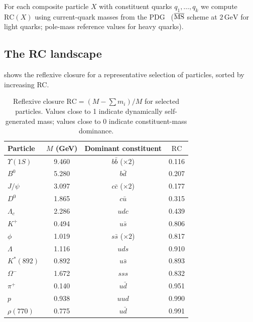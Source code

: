 \documentclass[12pt,a4paper]{article}
\newcommand{\RC}{\ensuremath{\mathrm{RC}}}
\begin{document}
For each composite particle $X$ with constituent quarks $q_1, \ldots, q_k$
we compute $\RC(X)$ using current-quark masses from the
PDG~\cite{ParticleDataGroup2024} ($\overline{\rm MS}$ scheme at $2\,\mathrm{GeV}$
for light quarks; pole-mass reference values for heavy quarks).

\subsection{The RC landscape}

 shows the reflexive closure for a representative
selection of particles, sorted by increasing RC.

\begin{table}[h]
\centering
\caption{Reflexive closure $\RC = (M - \sum m_i)/M$ for selected particles.
  Values close to 1 indicate dynamically self-generated mass;
  values close to 0 indicate constituent-mass dominance.}
\label{tab:rc_sample}
\small
\begin{tabular}{lccc}
\toprule
Particle & $M$ (GeV) & Dominant constituent & $\RC$ \\
\midrule
$\Upsilon(1S)$  & 9.460 & $b\bar b$ ($\times 2$) & 0.116 \\
$B^0$           & 5.280 & $b\bar d$              & 0.207 \\
$J/\psi$        & 3.097 & $c\bar c$ ($\times 2$) & 0.177 \\
$D^0$           & 1.865 & $c\bar u$              & 0.315 \\
$\Lambda_c$     & 2.286 & $udc$                  & 0.439 \\
$K^+$           & 0.494 & $u\bar s$              & 0.806 \\
$\phi$          & 1.019 & $s\bar s$ ($\times 2$) & 0.817 \\
$\Lambda$       & 1.116 & $uds$                  & 0.910 \\
$K^*(892)$      & 0.892 & $u\bar s$              & 0.893 \\
$\Omega^-$      & 1.672 & $sss$                  & 0.832 \\
$\pi^+$         & 0.140 & $u\bar d$              & 0.951 \\
$p$             & 0.938 & $uud$                  & 0.990 \\
$\rho(770)$     & 0.775 & $u\bar d$              & 0.991 \\
\bottomrule
\end{tabular}
\end{table}
\end{document}
